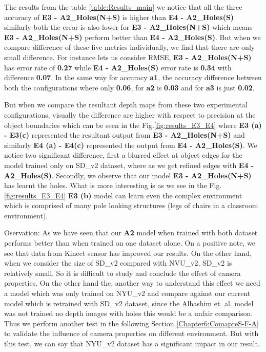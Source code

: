 The results from the table \ref{table:Results_main} we notice that all the three accuracy of \textbf{E3 - A2\_Holes(N+S)} is higher than \textbf{E4 - A2\_Holes(S)} similarly both the error is also lower for \textbf{E3 - A2\_Holes(N+S)} which means \textbf{E3 - A2\_Holes(N+S)} perform better than  \textbf{E4 - A2\_Holes(S)}. But when we compare difference of these five metrics individually, we find that there are only small difference. For instance lets us consider RMSE, \textbf{E3 - A2\_Holes(N+S)} has error rate of \textbf{0.27} while \textbf{E4 - A2\_Holes(S)} error rate is \textbf{0.34} with difference \textbf{0.07}. In the same way for accuracy \textbf{a1}, the accuracy difference between both the configurations where only \textbf{0.06}, for \textbf{a2} is \textbf{0.03} and for \textbf{a3} is just \textbf{0.02}. 

But when we compare the resultant depth maps from these two experimental configurations, visually the difference are higher with respect to precision at the object boundaries which can be seen in the Fig.\ref{fig:results_E3_E4}  where \textbf{E3 (a) - E3(c)} represented the resultant output from \textbf{E3 - A2\_Holes(N+S)} and similarly  \textbf{E4 (a) - E4(c)} represented the output from \textbf{E4 - A2\_Holes(S)}. We notice two significant difference, first a blurred effect at object edges for the model trained only on SD\_v2 dataset, where as we get refined edges with \textbf{E4 - A2\_Holes(S)}. Secondly, we observe that our model \textbf{E3 - A2\_Holes(N+S)} has learnt the holes. What is more interesting is as we see in the Fig. \ref{fig:results_E3_E4} \textbf{E3 (b)} model can learn even the complex environment which is comprised of many pole looking structures (legs of chairs in a classroom environment).

Oservation: As we have seen that our \textbf{A2} model when trained with both dataset performs better than when trained on one dataset alone. On a positive note, we see that data from Kinect sensor has improved our results. On the other hand, when we consider the size of SD\_v2 compared with NVU\_v2, SD\_v2 is relatively small. So it is difficult to study and conclude the effect of camera properties. On the other hand the, another way to understand this effect we need a model which was only trained on NYU\_v2 and compare against our current model which is retrained with SD\_v2 dataset, since the Alhashim et. al. model was not trained no depth images with holes this would be a unfair comparison. Thus we perform another test in the following Section \ref{Chapter6:ComapreS-F-A} to validate the influence of camera properties on different environment. But with this test, we can say that NYU\_v2 dataset has a significant impact in our result.

